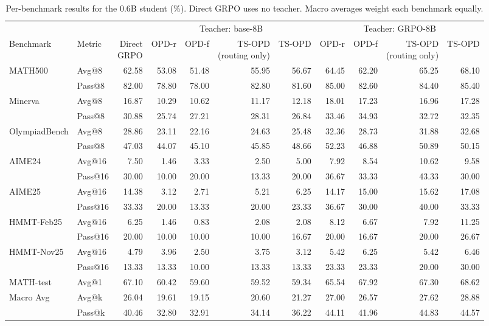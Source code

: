 \documentclass[10pt]{article}
\begin{document}
\begin{table}[h]
\centering
\scriptsize
\setlength{\tabcolsep}{3.5pt}
\caption{Per-benchmark results for the 0.6B student (\%). Direct GRPO uses no teacher. Macro averages weight each benchmark equally.}
\label{tab:app-full-06B}
\begin{tabular}{llrrrrrrrrr}
\toprule
 & & & \multicolumn{4}{c}{Teacher: base-8B} & \multicolumn{4}{c}{Teacher: GRPO-8B} \\
\cmidrule(lr){4-7}\cmidrule(lr){8-11}
Benchmark & Metric & \shortstack{Direct\\GRPO} & OPD-r & OPD-f & \shortstack{TS-OPD\\(routing only)} & TS-OPD & OPD-r & OPD-f & \shortstack{TS-OPD\\(routing only)} & TS-OPD \\
\midrule
MATH500 & Avg@8 & 62.58 & 53.08 & 51.48 & 55.95 & 56.67 & 64.45 & 62.20 & 65.25 & 68.10 \\
 & Pass@8 & 82.00 & 78.80 & 78.00 & 82.80 & 81.60 & 85.00 & 82.60 & 84.40 & 85.40 \\
Minerva & Avg@8 & 16.87 & 10.29 & 10.62 & 11.17 & 12.18 & 18.01 & 17.23 & 16.96 & 17.28 \\
 & Pass@8 & 30.88 & 25.74 & 27.21 & 28.31 & 26.84 & 33.46 & 34.93 & 32.72 & 32.35 \\
OlympiadBench & Avg@8 & 28.86 & 23.11 & 22.16 & 24.63 & 25.48 & 32.36 & 28.73 & 31.88 & 32.68 \\
 & Pass@8 & 47.03 & 44.07 & 45.10 & 45.85 & 48.66 & 52.23 & 46.88 & 50.89 & 50.15 \\
AIME24 & Avg@16 & 7.50 & 1.46 & 3.33 & 2.50 & 5.00 & 7.92 & 8.54 & 10.62 & 9.58 \\
 & Pass@16 & 30.00 & 10.00 & 20.00 & 13.33 & 20.00 & 36.67 & 33.33 & 43.33 & 30.00 \\
AIME25 & Avg@16 & 14.38 & 3.12 & 2.71 & 5.21 & 6.25 & 14.17 & 15.00 & 15.62 & 17.08 \\
 & Pass@16 & 33.33 & 20.00 & 13.33 & 20.00 & 23.33 & 36.67 & 30.00 & 40.00 & 33.33 \\
HMMT-Feb25 & Avg@16 & 6.25 & 1.46 & 0.83 & 2.08 & 2.08 & 8.12 & 6.67 & 7.92 & 11.25 \\
 & Pass@16 & 20.00 & 10.00 & 10.00 & 10.00 & 16.67 & 20.00 & 16.67 & 20.00 & 26.67 \\
HMMT-Nov25 & Avg@16 & 4.79 & 3.96 & 2.50 & 3.75 & 3.12 & 5.42 & 6.25 & 5.42 & 6.46 \\
 & Pass@16 & 13.33 & 13.33 & 10.00 & 13.33 & 13.33 & 23.33 & 23.33 & 20.00 & 30.00 \\
MATH-test & Avg@1 & 67.10 & 60.42 & 59.60 & 59.52 & 59.34 & 65.54 & 67.92 & 67.30 & 68.62 \\
\midrule
Macro Avg & Avg@k & 26.04 & 19.61 & 19.15 & 20.60 & 21.27 & 27.00 & 26.57 & 27.62 & 28.88 \\
 & Pass@k & 40.46 & 32.80 & 32.91 & 34.14 & 36.22 & 44.11 & 41.96 & 44.83 & 44.57 \\
\bottomrule
\end{tabular}
\end{table}
\end{document}
